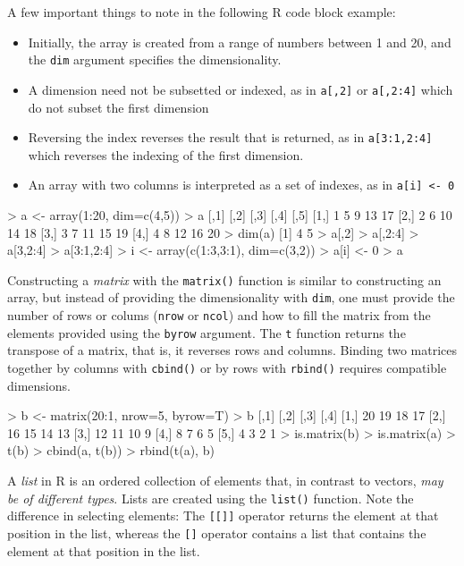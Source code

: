 A few important things to note in the following R code block example:
\begin{itemize}
   \item Initially, the array is created from a range of numbers between 1 and 20, and the \texttt{dim} argument specifies the dimensionality. 
   \item A dimension need not be subsetted or indexed, as in \texttt{a[,2]} or \texttt{a[,2:4]} which do not subset the first dimension
   \item Reversing the index reverses the result that is returned, as in \texttt{a[3:1,2:4]} which reverses the indexing of the first dimension. 
   \item An array with two columns is interpreted as a set of indexes, as in \texttt{a[i] <- 0}
\end{itemize}

\begin{samepage}
\begin{Rcode}
> a <- array(1:20, dim=c(4,5))
> a
     [,1] [,2] [,3] [,4] [,5]
[1,]    1    5    9   13   17
[2,]    2    6   10   14   18
[3,]    3    7   11   15   19
[4,]    4    8   12   16   20
> dim(a)
[1] 4 5
> a[,2]
> a[,2:4]
> a[3,2:4]
> a[3:1,2:4]
> i <- array(c(1:3,3:1), dim=c(3,2))
> a[i] <- 0
> a
\end{Rcode}
\end{samepage}

Constructing a \emph{matrix} with the \texttt{matrix()} function is similar to constructing an array, but instead of providing the dimensionality with \texttt{dim}, one must provide the number of rows or colums (\texttt{nrow} or \texttt{ncol}) and how to fill the matrix from the elements provided using the \texttt{byrow} argument. The \texttt{t} function returns the transpose of a matrix, that is, it reverses rows and columns. Binding two matrices together by columns with \texttt{cbind()} or by rows with \texttt{rbind()} requires compatible dimensions.

\begin{samepage}
\begin{Rcode}
> b <- matrix(20:1, nrow=5, byrow=T)
> b
     [,1] [,2] [,3] [,4]
[1,]   20   19   18   17
[2,]   16   15   14   13
[3,]   12   11   10    9
[4,]    8    7    6    5
[5,]    4    3    2    1
> is.matrix(b)
> is.matrix(a)
> t(b)
> cbind(a, t(b))
> rbind(t(a), b)
\end{Rcode}
\end{samepage}

A \emph{list} in R is an ordered collection of elements that, in contrast to vectors, \emph{may be of different types}. Lists are created using the \texttt{list()} function. Note the difference in selecting elements: The \texttt{[[]]} operator returns the element at that position in the list, whereas the \texttt{[]} operator contains a list that contains the element at that position in the list. 

